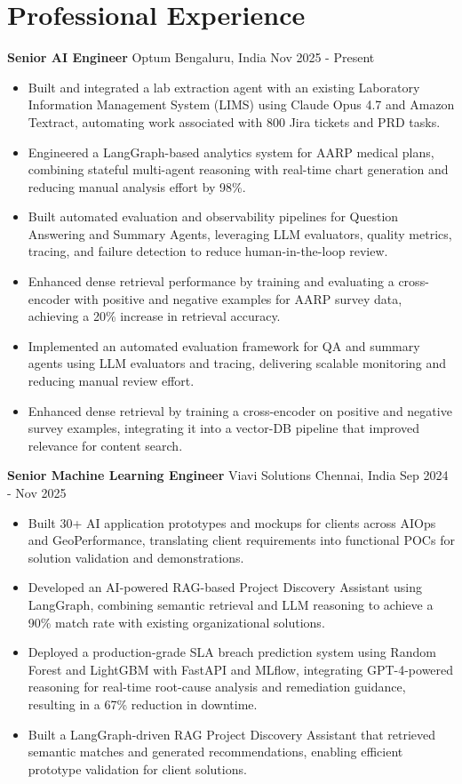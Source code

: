 \documentclass[10pt,a4paper]{article}
\newcommand{\role}[4]{\textbf{#1} \textbar{} #2 \hfill #3 \textbar{} #4\par}
\begin{document}
\section{Professional Experience}
\role{Senior AI Engineer}{Optum}{Bengaluru, India}{Nov 2025 - Present}
\begin{itemize}
  \item Built and integrated a lab extraction agent with an existing Laboratory Information Management System (LIMS) using Claude Opus 4.7 and Amazon Textract, automating work associated with 800 Jira tickets and PRD tasks.
  \item Engineered a LangGraph-based analytics system for AARP medical plans, combining stateful multi-agent reasoning with real-time chart generation and reducing manual analysis effort by 98\%.
  \item Built automated evaluation and observability pipelines for Question Answering and Summary Agents, leveraging LLM evaluators, quality metrics, tracing, and failure detection to reduce human-in-the-loop review.
  \item Enhanced dense retrieval performance by training and evaluating a cross-encoder with positive and negative examples for AARP survey data, achieving a 20\% increase in retrieval accuracy.
  \item Implemented an automated evaluation framework for QA and summary agents using LLM evaluators and tracing, delivering scalable monitoring and reducing manual review effort.
  \item Enhanced dense retrieval by training a cross-encoder on positive and negative survey examples, integrating it into a vector-DB pipeline that improved relevance for content search.
\end{itemize}
\vspace{3pt}
\role{Senior Machine Learning Engineer}{Viavi Solutions}{Chennai, India}{Sep 2024 - Nov 2025}
\begin{itemize}
  \item Built 30+ AI application prototypes and mockups for clients across AIOps and GeoPerformance, translating client requirements into functional POCs for solution validation and demonstrations.
  \item Developed an AI-powered RAG-based Project Discovery Assistant using LangGraph, combining semantic retrieval and LLM reasoning to achieve a 90\% match rate with existing organizational solutions.
  \item Deployed a production-grade SLA breach prediction system using Random Forest and LightGBM with FastAPI and MLflow, integrating GPT-4-powered reasoning for real-time root-cause analysis and remediation guidance, resulting in a 67\% reduction in downtime.
  \item Built a LangGraph-driven RAG Project Discovery Assistant that retrieved semantic matches and generated recommendations, enabling efficient prototype validation for client solutions.
\end{itemize}
\end{document}
